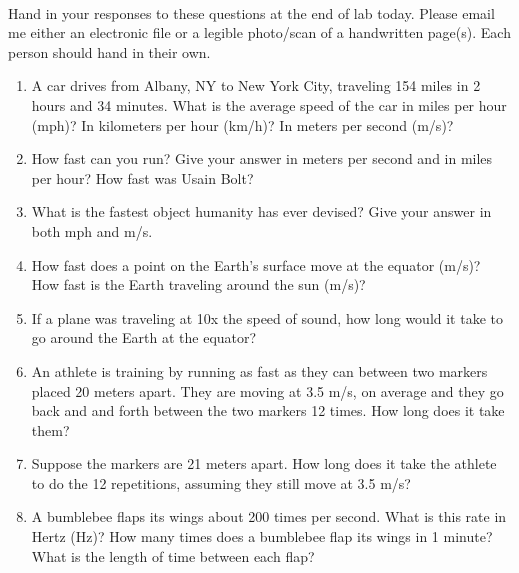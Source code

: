 \documentclass{tufte-handout}
\begin{document}



\vspace{0.5cm}
\\
\vspace{0.5cm}

Hand in your responses to these questions at the end of lab today.  Please email me either an electronic file or a legible photo/scan of a handwritten page(s).  Each person should hand in their own.

\begin{enumerate}

    \item A car drives from Albany, NY to New York City, traveling 154 miles in 2 hours and 34 minutes. What
        is the average speed of the car in miles per hour (mph)? In kilometers per hour (km/h)? In meters per second (m/s)? 

    \item How fast can you run? Give your answer in meters per second and in miles per hour? How fast was 
        Usain Bolt?

    \item What is the fastest object humanity has ever devised? Give your answer in both mph and m/s.

    \item How fast does a point on the Earth's surface move at the equator (m/s)? How fast is the Earth traveling
        around the sun (m/s)?

    \item If a plane was traveling at 10x the speed of sound, how long would it take to go around the Earth at 
        the equator?

    \item An athlete is training by running as fast as they can between two markers placed 20 meters
        apart. They are moving at 3.5 m/s, on average and they go back and and forth between the two 
        markers 12 times. How long does it take them? 

   \item Suppose the markers are 21 meters apart. How long does it take the athlete to do the 12 repetitions,
       assuming they still move at 3.5 m/s?

   \item A bumblebee flaps its wings about 200 times per second. What is this rate in Hertz (Hz)? How many times
       does a bumblebee flap its wings in 1 minute? What is the length of time between each flap?


\end{enumerate}
\end{document}
